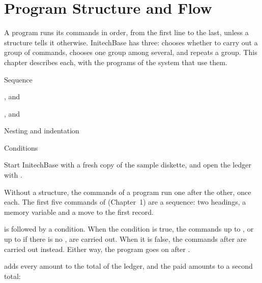 \chapter{Program Structure and Flow}
A program runs its commands in order, from the first line to the last, unless a
structure tells it otherwise.  InitechBase has three:  chooses whether
to carry out a group of commands,  chooses one group among
several, and  repeats a group.  This chapter describes each, with
the programs of the system that use them.

\begin{ChapterCovers}
\item Sequence
\item {},  and 
\item {}
\item {},  and 
\item Nesting and indentation
\item Conditions
\end{ChapterCovers}

Start InitechBase with a fresh copy of the sample diskette, and open the ledger
with .

Without a structure, the commands of a program run one after the other, once
each.  The first five commands of  (Chapter~1) are a sequence:
two headings, a memory variable and a move to the first record.

 is followed by a condition.  When the condition is true, the commands
up to , or up to  if there is no , are carried
out.  When it is false, the commands after  are carried out instead.
Either way, the program goes on after .


 adds every amount to the total of the ledger, and the paid
amounts to a second total:

